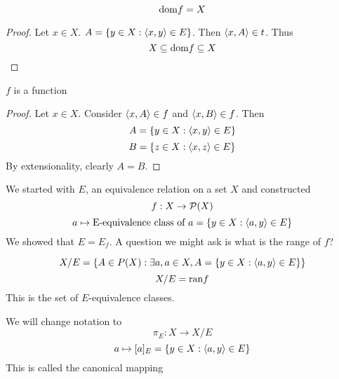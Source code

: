 \begin{prop}
\[\dom f = X\]
\end{prop}
\begin{proof}
Let $x \in X$. $A = \{y \in X: \la x, y\ra \in E\}$. Then $\la x, A\ra \in t$. Thus 
\[X \subseteq \dom f \subseteq X\]
\end{proof}
\begin{prop}
    $f$ is a function
    \end{prop}
    \begin{proof}
    Let $x \in X$. Consider $\la x, A\ra \in f$ and $\la x, B\ra \in f$. Then 
    \[A = \{y \in X: \la x, y\ra \in E\}\]
    \[B = \{z \in X: \la x, z\ra \in E\}\]
    By extensionality, clearly $A = B$.
    \end{proof}
\begin{rem}
We started with $E$, an equivalence relation on a set $X$ and constructed 
\[f: X \to \P(X)\]
\[a \mapsto \text{E-equivalence class of } a =  \{y \in X: \la a, y\ra \in E\}\]
We showed that $E = E_f$. A question we might ask is what is the range of $f$?
\end{rem}
\begin{defn}[Quotients]
\[X/E = \{A \in P(X): \exists a, a \in X, A = \{y \in X: \la a, y\ra \in E\}\}\]
\[X/E = \ran f\]
This is the set of $E$-equivalence classes.
\end{defn}
\begin{defn}
We will change notation to 
\[\pi_E: X \to X/E\]
\[a \mapsto [a]_E = \{y \in X: \la a, y\ra \in E\}\]
This is called the canonical mapping
\end{defn}

